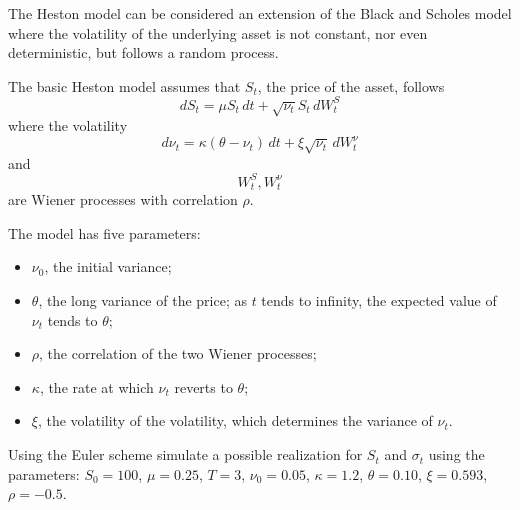 \documentclass[12pt,a4paper]{book}
\begin{document}
\begin{exercise}[subtitle=Heston Model (\texttt{python})]
The Heston model can be considered an extension of the Black and Scholes model where the volatility of the underlying asset is not constant, nor even deterministic, but follows a random process.

The basic Heston model assumes that $S_t$, the price of the asset, follows
\begin{equation}
dS_{t}=\mu S_{t}\,dt+{\sqrt {\nu _{t}}}S_{t}\,dW_{t}^{S}
\end{equation}
where the volatility 
\begin{equation}
d\nu _{t}=\kappa (\theta -\nu _{t})\,dt+\xi {\sqrt {\nu_{t}}}\,dW_{t}^{\nu }
\end{equation}
and 
\begin{equation}
W_{t}^{S},W_{t}^{\nu }
\end{equation} 
are Wiener processes with correlation $\rho$.

The model has five parameters:
\begin{itemize}
\item $\nu _0$, the initial variance;
\item $\theta$, the long variance of the price; as $t$ tends to infinity, the expected value of $\nu_t$ tends to $\theta$;
\item $\rho$, the correlation of the two Wiener processes;
\item $\kappa$, the rate at which $\nu_t$ reverts to $\theta$;
\item $\xi$, the volatility of the volatility, which determines the variance of $\nu_t$.
\end{itemize}

Using the Euler scheme simulate a possible realization for $S_t$ and $\sigma_t$ using the parameters: $S_0=100$, $\mu=0.25$, $T=3$, $\nu_0=0.05$, $\kappa=1.2$, $\theta=0.10$, $\xi=0.593$, $\rho=-0.5$.
\end{exercise}
\end{document}
